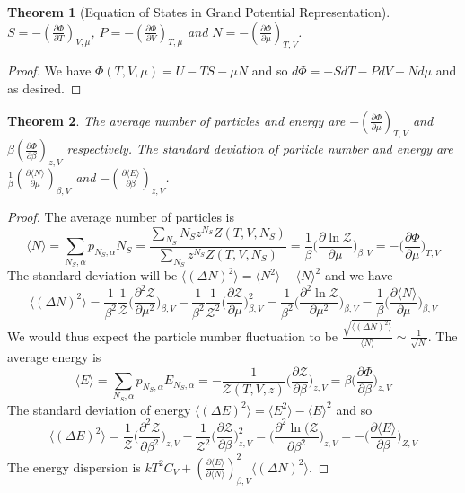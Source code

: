 \documentclass[a4paper]{article}
\newtheorem{thm}{Theorem}[section]
\theoremstyle{new}
\begin{document}
\begin{thm}[Equation of States in Grand Potential Representation]
$S=-(\frac{\partial\Phi}{\partial T})_{V,\mu}$, $P=-(\frac{\partial\Phi}{\partial V})_{T,\mu}$ and $N=-(\frac{\partial\Phi}{\partial\mu})_{T,V}$.
\end{thm}
\begin{proof}
We have $\Phi(T,V,\mu)=U-TS-\mu N$ and so $d\Phi=-SdT-PdV-Nd\mu$ and as desired.
\end{proof}
\begin{thm}
The average number of particles and energy are $-(\frac{\partial\Phi}{\partial\mu})_{T,V}$ and $\beta(\frac{\partial\Phi}{\partial\beta})_{z,V}$ respectively. The standard deviation of particle number and energy are $\frac{1}{\beta}(\frac{\partial\langle N\rangle}{\partial\mu})_{\beta,V}$ and $-(\frac{\partial\langle E\rangle}{\partial\beta})_{z,V}$.
\end{thm}
\begin{proof}
The average number of particles is
$$\langle N\rangle=\sum_{N_S,\alpha}p_{N_S,\alpha} N_S=\frac{\sum_{N_S}N_Sz^{N_S}Z(T,V,N_S)}{\sum_{N_S}z^{N_S}Z(T,V,N_S)}=\frac{1}{\beta}\bigg(\frac{\partial\ln\mathcal{Z}}{\partial\mu}\bigg)_{\beta,V}=-\bigg(\frac{\partial\Phi}{\partial\mu}\bigg)_{T,V}$$
The standard deviation will be $\langle(\Delta N)^2\rangle=\langle N^2\rangle-\langle N\rangle^2$ and we have
$$\langle(\Delta N)^2\rangle=\frac{1}{\beta^2}\frac{1}{\mathcal{Z}}\bigg(\frac{\partial^2\mathcal{Z}}{\partial\mu^2}\bigg)_{\beta,V}-\frac{1}{\beta^2}\frac{1}{\mathcal{Z}^2}\bigg(\frac{\partial\mathcal{Z}}{\partial\mu}\bigg)^2_{\beta,V}=\frac{1}{\beta^2}\bigg(\frac{\partial^2\ln\mathcal{Z}}{\partial\mu^2}\bigg)_{\beta,V}=\frac{1}{\beta}\bigg(\frac{\partial\langle N\rangle}{\partial\mu}\bigg)_{\beta,V}$$
We would thus expect the particle number fluctuation to be $\frac{\sqrt{\langle(\Delta N)^2\rangle}}{\langle N\rangle}\sim\frac{1}{\sqrt{N}}$. The average energy is
$$\langle E\rangle=\sum_{N_S,\alpha}p_{N_S,\alpha}E_{N_S,\alpha}=-\frac{1}{\mathcal{Z}(T,V,z)}\bigg(\frac{\partial\mathcal{Z}}{\partial\beta}\bigg)_{z,V}=\beta\bigg(\frac{\partial\Phi}{\partial\beta}\bigg)_{z,V}$$
The standard deviation of energy $\langle(\Delta E)^2\rangle=\langle E^2\rangle-\langle E\rangle^2$ and so
$$\langle(\Delta E)^2\rangle=\frac{1}{\mathcal{Z}}\bigg(\frac{\partial^2\mathcal{Z}}{\partial\beta^2}\bigg)_{z,V}-\frac{1}{\mathcal{Z}^2}\bigg(\frac{\partial\mathcal{Z}}{\partial\beta}\bigg)^2_{z,V}=\bigg(\frac{\partial^2\ln(\mathcal{Z}}{\partial\beta^2}\bigg)_{z,V}=-\bigg(\frac{\partial\langle E\rangle}{\partial\beta}\bigg)_{Z,V}$$
The energy dispersion is $kT^2C_V+(\frac{\partial\langle E\rangle}{\partial\langle N\rangle})_{\beta,V}^2\langle(\Delta N)^2\rangle$.
\end{proof}
\end{document}
